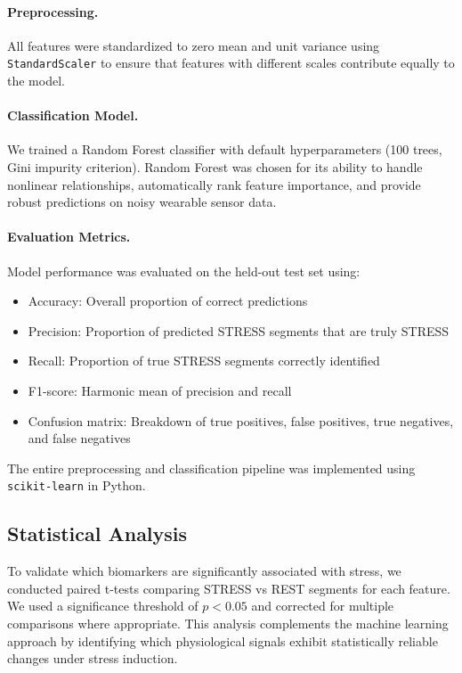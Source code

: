 \documentclass[12pt,letterpaper]{article}
\begin{document}
\paragraph{Preprocessing.} All features were standardized to zero mean and unit variance using \texttt{StandardScaler} to ensure that features with different scales contribute equally to the model.

\paragraph{Classification Model.} We trained a Random Forest classifier with default hyperparameters (100 trees, Gini impurity criterion). Random Forest was chosen for its ability to handle nonlinear relationships, automatically rank feature importance, and provide robust predictions on noisy wearable sensor data.

\paragraph{Evaluation Metrics.} Model performance was evaluated on the held-out test set using:
\begin{itemize}
    \item Accuracy: Overall proportion of correct predictions
    \item Precision: Proportion of predicted STRESS segments that are truly STRESS
    \item Recall: Proportion of true STRESS segments correctly identified
    \item F1-score: Harmonic mean of precision and recall
    \item Confusion matrix: Breakdown of true positives, false positives, true negatives, and false negatives
\end{itemize}

The entire preprocessing and classification pipeline was implemented using \texttt{scikit-learn} in Python.

\subsection{Statistical Analysis}

To validate which biomarkers are significantly associated with stress, we conducted paired t-tests comparing STRESS vs REST segments for each feature. We used a significance threshold of $p < 0.05$ and corrected for multiple comparisons where appropriate. This analysis complements the machine learning approach by identifying which physiological signals exhibit statistically reliable changes under stress induction.
\end{document}
